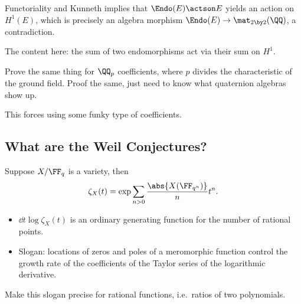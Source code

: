 \begin{exercise}

Functoriality and Kunneth implies that \(\Endo(E)\actson E\) yields an
action on \(H^1(E)\), which is precisely an algebra morphism
\(\Endo(E) \to \mat_{2\by 2}(\QQ)\), a contradiction.

The content here: the sum of two endomorphisms act via their sum on
\(H^1\).

\end{exercise}

\begin{exercise}

Prove the same thing for \(\QQ_p\) coefficients, where \(p\) divides the
characteristic of the ground field. Proof the same, just need to know
what quaternion algebras show up.

\end{exercise}

This forces using some funky type of coefficients.

\hypertarget{what-are-the-weil-conjectures}{%
\subsection{What are the Weil
Conjectures?}\label{what-are-the-weil-conjectures}}

Suppose \(X/\FF_q\) is a variety, then
\begin{align*}  
\zeta_X(t) = \exp{\sum_{n>0} { {\abs{X(\FF_{q^n})} \over n} t^n } }
.\end{align*}

\begin{remark}

\envlist

\begin{itemize}
\item
  \(\dd{}{t} \log \zeta_X(t)\) is an ordinary generating function for
  the number of rational points.
\item
  Slogan: locations of zeros and poles of a meromorphic function control
  the growth rate of the coefficients of the Taylor series of the
  logarithmic derivative.
\end{itemize}

\end{remark}

\begin{exercise}

Make this slogan precise for rational functions, i.e.~ratios of two
polynomials.

\end{exercise}

